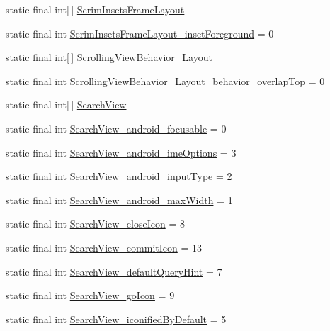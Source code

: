 \begin{CompactItemize}
static final int\mbox{[}$\,$\mbox{]} \hyperlink{classandroid_1_1support_1_1v4_1_1_r_1_1styleable_e0e3b150de2aa8edce58bfe61daca7de}{ScrimInsetsFrameLayout}
\item 
static final int \hyperlink{classandroid_1_1support_1_1v4_1_1_r_1_1styleable_aef50da4fe5b50ca44ecc45c36db73c8}{ScrimInsetsFrameLayout\_\-insetForeground} = 0
\item 
static final int\mbox{[}$\,$\mbox{]} \hyperlink{classandroid_1_1support_1_1v4_1_1_r_1_1styleable_7f394b84e58daeccda900f698e6700ca}{ScrollingViewBehavior\_\-Layout}
\item 
static final int \hyperlink{classandroid_1_1support_1_1v4_1_1_r_1_1styleable_9fea49ba22c6071b652bd5d634a21a47}{ScrollingViewBehavior\_\-Layout\_\-behavior\_\-overlapTop} = 0
\item 
static final int\mbox{[}$\,$\mbox{]} \hyperlink{classandroid_1_1support_1_1v4_1_1_r_1_1styleable_63a589da97c59fb7eebd9759edb31f0d}{SearchView}
\item 
static final int \hyperlink{classandroid_1_1support_1_1v4_1_1_r_1_1styleable_e995a1e9fe744b38a1cd3db6e38b9003}{SearchView\_\-android\_\-focusable} = 0
\item 
static final int \hyperlink{classandroid_1_1support_1_1v4_1_1_r_1_1styleable_924ffeb8267d0e19f5948a2ccbf8b1b2}{SearchView\_\-android\_\-imeOptions} = 3
\item 
static final int \hyperlink{classandroid_1_1support_1_1v4_1_1_r_1_1styleable_b8d1739250c6edeea1c7639b77701e8a}{SearchView\_\-android\_\-inputType} = 2
\item 
static final int \hyperlink{classandroid_1_1support_1_1v4_1_1_r_1_1styleable_a7408a4cb904af448f8138e31449f9aa}{SearchView\_\-android\_\-maxWidth} = 1
\item 
static final int \hyperlink{classandroid_1_1support_1_1v4_1_1_r_1_1styleable_604e593d78318f98842bc75b6f058c85}{SearchView\_\-closeIcon} = 8
\item 
static final int \hyperlink{classandroid_1_1support_1_1v4_1_1_r_1_1styleable_7596f400f76fad60028392a5d9d8e462}{SearchView\_\-commitIcon} = 13
\item 
static final int \hyperlink{classandroid_1_1support_1_1v4_1_1_r_1_1styleable_269652287752b5c18c19cdf2cf0aeb52}{SearchView\_\-defaultQueryHint} = 7
\item 
static final int \hyperlink{classandroid_1_1support_1_1v4_1_1_r_1_1styleable_90f7086fb0866e78b77259eb32289c59}{SearchView\_\-goIcon} = 9
\item 
static final int \hyperlink{classandroid_1_1support_1_1v4_1_1_r_1_1styleable_082b54398657d1cdbea56322bf7c5e7f}{SearchView\_\-iconifiedByDefault} = 5

\end{CompactItemize}
